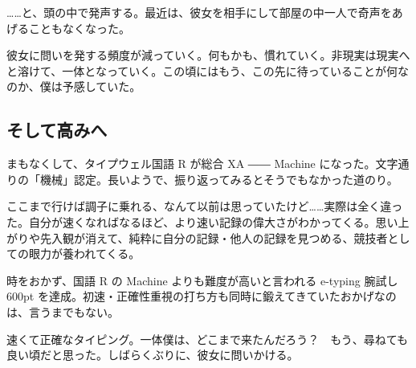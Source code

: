 






……と、頭の中で発声する。最近は、彼女を相手にして部屋の中一人で奇声をあげることもなくなった。

彼女に問いを発する頻度が減っていく。何もかも、慣れていく。非現実は現実へと溶けて、一体となっていく。この頃にはもう、この先に待っていることが何なのか、僕は予感していた。

\subsection{そして高みへ}

まもなくして、タイプウェル国語 R が総合 XA ―― Machine になった。文字通りの「機械」認定。長いようで、振り返ってみるとそうでもなかった道のり。

ここまで行けば調子に乗れる、なんて以前は思っていたけど……実際は全く違った。自分が速くなればなるほど、より速い記録の偉大さがわかってくる。思い上がりや先入観が消えて、純粋に自分の記録・他人の記録を見つめる、競技者としての眼力が養われてくる。

時をおかず、国語 R の Machine よりも難度が高いと言われる e-typing 腕試し 600pt を達成。初速・正確性重視の打ち方も同時に鍛えてきていたおかげなのは、言うまでもない。

速くて正確なタイピング。一体僕は、どこまで来たんだろう？　もう、尋ねても良い頃だと思った。しばらくぶりに、彼女に問いかける。


